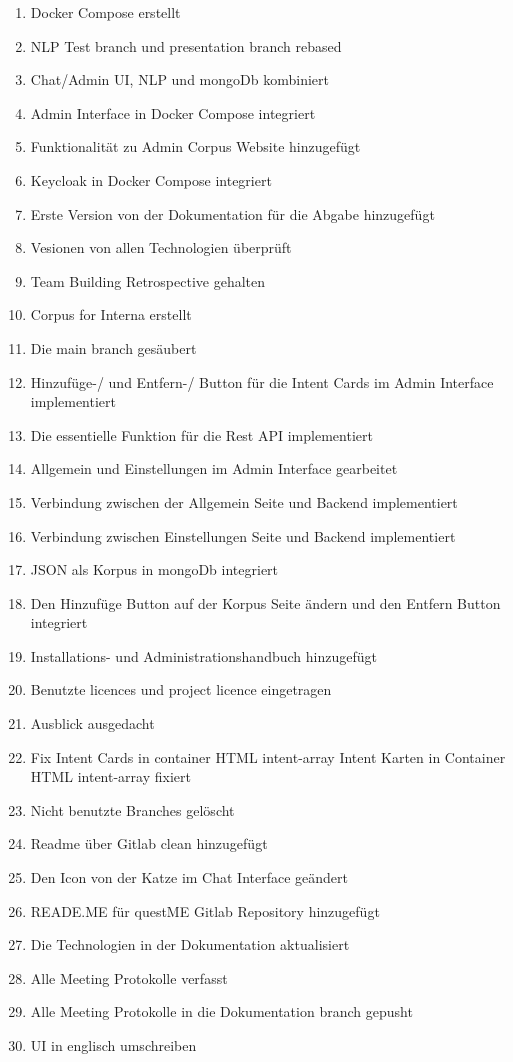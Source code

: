 \begin{enumerate}
\item Docker Compose erstellt
\item NLP Test branch und presentation branch rebased
\item Chat/Admin UI, NLP und mongoDb kombiniert
\item Admin Interface in Docker Compose integriert
\item Funktionalität zu Admin Corpus Website hinzugefügt
\item Keycloak in Docker Compose integriert
\item Erste Version von der Dokumentation für die Abgabe hinzugefügt
\item Vesionen von allen Technologien überprüft
\item Team Building Retrospective gehalten
\item Corpus for Interna erstellt
\item Die main branch gesäubert
\item Hinzufüge-/ und Entfern-/ Button für die Intent Cards im Admin Interface implementiert
\item Die essentielle Funktion für die Rest API implementiert
\item Allgemein und Einstellungen im Admin Interface gearbeitet
\item Verbindung zwischen der Allgemein Seite und Backend implementiert
\item Verbindung zwischen Einstellungen Seite und Backend implementiert
\item JSON als Korpus in mongoDb integriert
\item Den Hinzufüge Button auf der Korpus Seite ändern und den Entfern Button integriert
\item Installations- und Administrationshandbuch hinzugefügt
\item Benutzte licences und project licence eingetragen
\item Ausblick ausgedacht
\item Fix Intent Cards in container HTML intent-array Intent Karten in Container HTML intent-array fixiert
\item Nicht benutzte Branches gelöscht
\item Readme über Gitlab clean hinzugefügt
\item Den Icon von der Katze im Chat Interface geändert
\item READE.ME für questME Gitlab Repository hinzugefügt
\item Die Technologien in der Dokumentation aktualisiert
\item Alle Meeting Protokolle verfasst
\item Alle Meeting Protokolle in die Dokumentation branch gepusht
\item UI in englisch umschreiben
\end{enumerate}

